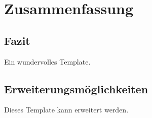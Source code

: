 \chapter{Zusammenfassung}
\label{chap:zusammenfassung}

\section{Fazit}
Ein wundervolles Template.

\section{Erweiterungsmöglichkeiten}
Dieses Template kann erweitert werden.